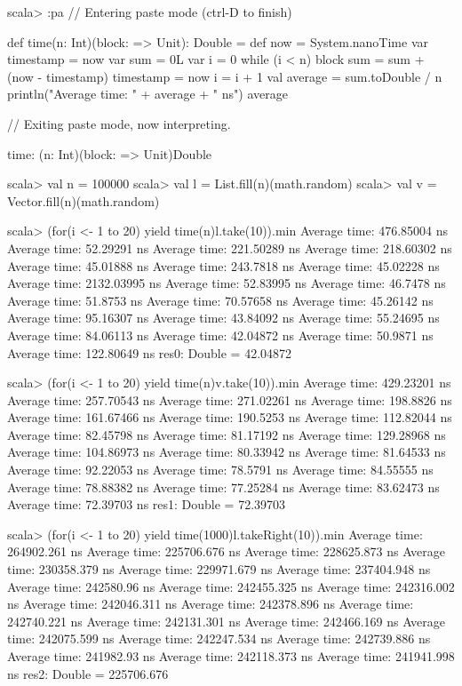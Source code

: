 {{\begin{REPLnonum}
scala> :pa
// Entering paste mode (ctrl-D to finish)

def time(n: Int)(block: => Unit): Double =  {
  def now = System.nanoTime
  var timestamp = now
  var sum = 0L
  var i = 0
  while (i < n) {
    block
    sum = sum + (now - timestamp)
    timestamp = now
    i = i + 1
  }
  val average = sum.toDouble / n
  println("Average time: " + average + " ns")
  average
}

// Exiting paste mode, now interpreting.

time: (n: Int)(block: => Unit)Double

scala> val n = 100000
scala> val l = List.fill(n)(math.random)
scala> val v = Vector.fill(n)(math.random)

scala> (for(i <- 1 to 20) yield time(n){l.take(10)}).min
Average time: 476.85004 ns
Average time: 52.29291 ns
Average time: 221.50289 ns
Average time: 218.60302 ns
Average time: 45.01888 ns
Average time: 243.7818 ns
Average time: 45.02228 ns
Average time: 2132.03995 ns
Average time: 52.83995 ns
Average time: 46.7478 ns
Average time: 51.8753 ns
Average time: 70.57658 ns
Average time: 45.26142 ns
Average time: 95.16307 ns
Average time: 43.84092 ns
Average time: 55.24695 ns
Average time: 84.06113 ns
Average time: 42.04872 ns
Average time: 50.9871 ns
Average time: 122.80649 ns
res0: Double = 42.04872


scala> (for(i <- 1 to 20) yield time(n){v.take(10)}).min
Average time: 429.23201 ns
Average time: 257.70543 ns
Average time: 271.02261 ns
Average time: 198.8826 ns
Average time: 161.67466 ns
Average time: 190.5253 ns
Average time: 112.82044 ns
Average time: 82.45798 ns
Average time: 81.17192 ns
Average time: 129.28968 ns
Average time: 104.86973 ns
Average time: 80.33942 ns
Average time: 81.64533 ns
Average time: 92.22053 ns
Average time: 78.5791 ns
Average time: 84.55555 ns
Average time: 78.88382 ns
Average time: 77.25284 ns
Average time: 83.62473 ns
Average time: 72.39703 ns
res1: Double = 72.39703

scala> (for(i <- 1 to 20) yield time(1000){l.takeRight(10)}).min
Average time: 264902.261 ns
Average time: 225706.676 ns
Average time: 228625.873 ns
Average time: 230358.379 ns
Average time: 229971.679 ns
Average time: 237404.948 ns
Average time: 242580.96 ns
Average time: 242455.325 ns
Average time: 242316.002 ns
Average time: 242046.311 ns
Average time: 242378.896 ns
Average time: 242740.221 ns
Average time: 242131.301 ns
Average time: 242466.169 ns
Average time: 242075.599 ns
Average time: 242247.534 ns
Average time: 242739.886 ns
Average time: 241982.93 ns
Average time: 242118.373 ns
Average time: 241941.998 ns
res2: Double = 225706.676


\end{REPLnonum}}}
